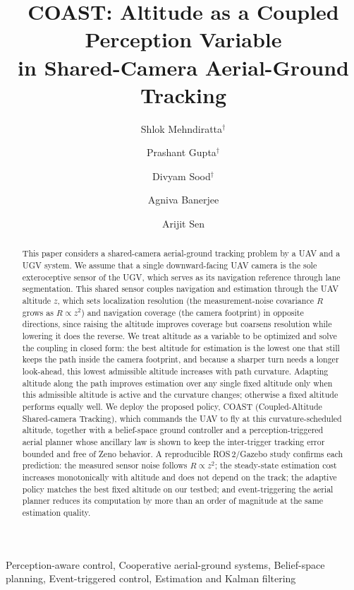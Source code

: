 \documentclass{ifacconf}
\begin{document}
\begin{frontmatter}

\title{COAST: Altitude as a Coupled Perception Variable\\ in Shared-Camera Aerial-Ground Tracking}

\author[First]{Shlok Mehndiratta$^{\dagger}$}
\author[First]{Prashant Gupta$^{\dagger}$} 
\author[First]{Divyam Sood$^{\dagger}$} 
\author[First]{Agniva Banerjee} 
\author[First]{Arijit Sen}
\address[First]{Department of Electrical Engineering and Computer Science, IISER Bhopal, India. (e-mail: \{shlokm23, prashant23, divyam23, agniva24, ajsen\}@iiserb.ac.in).}

\begin{abstract}
This paper considers a shared-camera aerial-ground tracking problem by a UAV and a UGV system. We assume
that a single downward-facing UAV camera is the sole exteroceptive sensor of the UGV, which serves as its
navigation reference through lane segmentation. This shared sensor couples navigation and estimation
through the UAV altitude $z$, which sets localization resolution (the measurement-noise covariance $R$
grows as $R\propto z^2$) and navigation coverage (the camera footprint) in opposite directions, since
raising the altitude improves coverage but coarsens resolution while lowering it does the reverse. We treat
altitude as a variable to be optimized and solve the coupling in closed form: the best altitude for
estimation is the lowest one that still keeps the path inside the camera footprint, and because a sharper
turn needs a longer look-ahead, this lowest admissible altitude increases with path curvature. Adapting
altitude along the path improves estimation over any single fixed altitude only when this admissible
altitude is active and the curvature changes; otherwise a fixed altitude performs equally well. We deploy
the proposed policy, COAST (Coupled-Altitude Shared-camera Tracking), which commands the UAV to fly at this
curvature-scheduled altitude, together with a belief-space ground controller and a perception-triggered
aerial planner whose ancillary law is shown to keep the inter-trigger tracking error bounded and free of
Zeno behavior. A reproducible ROS\,2/Gazebo study confirms each prediction: the measured sensor noise
follows $R\propto z^2$; the steady-state estimation cost increases monotonically with altitude and does not
depend on the track; the adaptive policy matches the best fixed altitude on our testbed; and
event-triggering the aerial planner reduces its computation by more than an order of magnitude at the same
estimation quality.
\end{abstract}

\begin{keyword}
Perception-aware control, Cooperative aerial-ground systems, Belief-space planning,
Event-triggered control, Estimation and Kalman filtering
\end{keyword}

\end{frontmatter}
\end{document}
